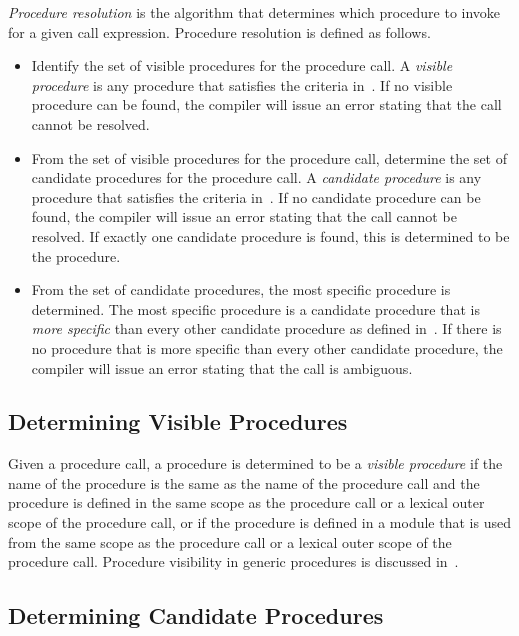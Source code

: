 \emph{Procedure resolution} is the algorithm that determines
which procedure to invoke for a given call expression.
Procedure resolution is defined as follows.
\begin{itemize}
\item
Identify the set of visible procedures for the procedure call.  A
\emph{visible procedure} is any procedure that satisfies the criteria
in~.  If no visible procedure can
be found, the compiler will issue an error stating that the call
cannot be resolved.
\item
From the set of visible procedures for the procedure call, determine the
set of candidate procedures for the procedure call.  A \emph{candidate
procedure} is any procedure that satisfies the criteria
in~.  If no candidate procedure
can be found, the compiler will issue an error stating that the call
cannot be resolved.  If exactly one candidate procedure is found, this
is determined to be the procedure.
\item
From the set of candidate procedures, the most specific procedure is
determined.  The most specific procedure is a candidate procedure that
is \emph{more specific} than every other candidate procedure as defined
in~.  If there is no
procedure that is more specific than every other candidate procedure,
the compiler will issue an error stating that the call is ambiguous.
\end{itemize}

\subsection{Determining Visible Procedures}
\label{Determining_Visible_Procedures}

Given a procedure call, a procedure is determined to be a \emph{visible
procedure} if the name of the procedure is the same as the name of the
procedure call and the procedure is defined in the same scope as the
procedure call or a lexical outer scope of the procedure call, or if the
procedure is defined in a module that is used from the same scope as
the procedure call or a lexical outer scope of the procedure call.
Procedure visibility in generic procedures is discussed
in~.

\subsection{Determining Candidate Procedures}
\label{Determining_Candidate_Procedures}

